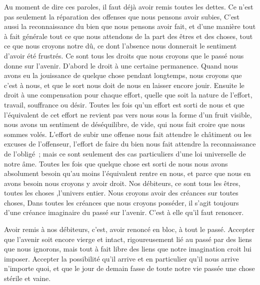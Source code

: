 \documentclass[french,twoside]{book} %
\newenvironment{quoteblock}%
  {\begin{quoting}}
  {\end{quoting}}
\newenvironment{quotebar}{%
    \def\FrameCommand{{\color{rubric!10!}\vrule width 0.5em} \hspace{0.9em}}%
    \def\OuterFrameSep{\itemsep} %
    \MakeFramed {\advance\hsize-\width \FrameRestore}
  }%
  {%
    \endMakeFramed
  }
\renewenvironment{quoteblock}%
  {%
    \savenotes
    \setstretch{0.9}
    \normalfont
    \begin{quotebar}
  }
  {%
    \end{quotebar}
    \spewnotes
  }
\begin{document}
\begin{quoteblock}
 \end{quoteblock}

\noindent Au moment de dire ces paroles, il faut déjà avoir remis toutes les dettes. Ce n'est pas seulement la réparation des offenses que nous pensons avoir subies, C'est aussi la reconnaissance du bien que nous pensons avoir fait, et d'une manière tout à fait générale tout ce que nous attendons de la part des êtres et des choses, tout ce que nous croyons notre dû, ce dont l'absence nous donnerait le sentiment d'avoir été frustrés. Ce sont tous les droits que nous croyons que le passé nous donne sur l'avenir. D'abord le droit à une certaine permanence. Quand nous avons eu la jouissance de quelque chose pendant longtemps, nous croyons que c'est à nous, et que le sort nous doit de nous en laisser encore jouir. Ensuite le droit à une compensation pour chaque effort, quelle que soit la nature de l'effort, travail, souffrance ou désir. Toutes les fois qu'un effort est sorti de nous et que l'équivalent de cet effort ne revient pas vers nous sous la forme d'un fruit visible, nous avons un sentiment de déséquilibre, de vide, qui nous fait croire que nous sommes volés. L'effort de subir une offense nous fait attendre le châtiment ou les excuses de l'offenseur, l'effort de faire du bien nous fait attendre la reconnaissance de l'obligé ; mais ce sont seulement des cas particuliers d'une loi universelle de notre âme. Toutes les fois que quelque chose est sorti de nous nous avons absolument besoin qu'au moins l'équivalent rentre en nous, et parce que nous en avons besoin nous croyons y avoir droit. Nos débiteurs, ce sont tous les êtres, toutes les choses ,l'univers entier. Nous croyons avoir des créances sur toutes choses, Dans toutes les créances que nous croyons posséder, il s'agit toujours d'une créance imaginaire du passé sur l'avenir. C'est à elle qu'il faut renoncer.\par
Avoir remis à nos débiteurs, c'est, avoir renoncé en bloc, à tout le passé. Accepter que l'avenir soit encore vierge et intact, rigoureusement lié au passé par des liens que nous ignorons, mais tout à fait libre des liens que notre imagination croit lui imposer. Accepter la possibilité qu'il arrive et en particulier qu'il nous arrive n'importe quoi, et que le jour de demain fasse de toute notre vie passée une chose stérile et vaine.\par
\end{document}
